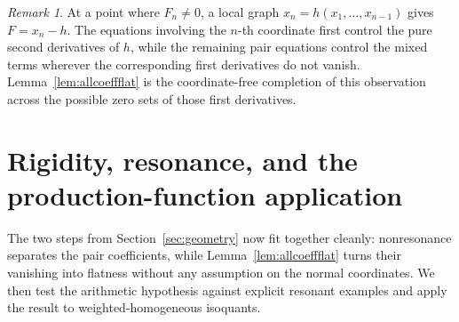 \documentclass[preprint,12pt]{elsarticle}
\numberwithin{equation}{section}
\theoremstyle{definition}\newtheorem{definition}[theorem]{Definition}
\theoremstyle{remark}\newtheorem{remark}[theorem]{Remark}
\begin{document}
\begin{remark}\label{rem:graph}
At a point where $F_n\ne0$, a local graph $x_n=h(x_1,\ldots,x_{n-1})$ gives $F=x_n-h$. The equations involving the $n$-th coordinate first control the pure second derivatives of $h$, while the remaining pair equations control the mixed terms wherever the corresponding first derivatives do not vanish. Lemma~\ref{lem:allcoeffflat} is the coordinate-free completion of this observation across the possible zero sets of those first derivatives.
\end{remark}

\section{Rigidity, resonance, and the production-function application}\label{sec:main}

The two steps from Section~\ref{sec:geometry} now fit together cleanly: nonresonance separates the pair coefficients, while Lemma~\ref{lem:allcoeffflat} turns their vanishing into flatness without any assumption on the normal coordinates. We then test the arithmetic hypothesis against explicit resonant examples and apply the result to weighted-homogeneous isoquants.
\end{document}
